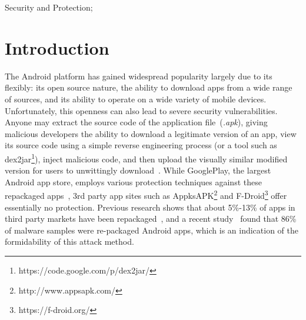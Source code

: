 \documentclass{sig-alternate}
\newif\ifisnopii
\newcommand{\sam}[1]{\textcolor{red}{{\it [Sam says: #1]}}}
\begin{document}
Security and Protection;






\section{Introduction}


%


The Android platform has gained widespread popularity largely due to its flexibly: its open source nature, the ability to download apps from a wide range of sources, and its ability to operate on a wide variety of mobile devices. Unfortunately, this openness can also lead to severe security vulnerabilities. Anyone may extract the source code of the application file~(\emph{.apk}), giving malicious developers the ability to download a legitimate version of an app, view its source code using a simple reverse engineering process (or a tool such as dex2jar\footnote{https://code.google.com/p/dex2jar/}), inject malicious code, and then upload the visually similar modified version for users to unwittingly download~\cite{Gibler_adrob:examining}. While GooglePlay, the largest Android app store, employs various protection techniques against these repackaged apps~\cite{bouncer_url1}, 3rd party app sites such as AppksAPK\footnote{http://www.appsapk.com/} and F-Droid\footnote{https://f-droid.org/} offer essentially no protection. Previous research shows that about 5\%-13\% of apps in third party markets have been repackaged~\cite{Zhou:2012:DRS:2133601.2133640}, and a recent study~\cite{Zhou:2012:DAM:2310656.2310710} found that 86\% of malware samples were re-packaged Android apps, which is an indication of the formidability of this attack method.
\end{document}
